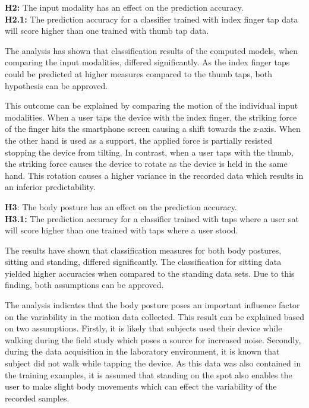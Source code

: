 \begin{center}
  \begin{framed}
    \textbf{H2:} The input modality has an effect on the prediction accuracy.\\
    \textbf{H2.1:} The prediction accuracy for a classifier trained with index finger tap data will score higher than one trained with thumb tap data.
  \end{framed}
\end{center}

The analysis has shown that classification results of the computed models, when comparing the input modalities, differed significantly. As the index finger taps could be predicted at higher measures compared to the thumb taps, both hypothesis can be approved.

This outcome can be explained by comparing the motion of the individual input modalities. When a user taps the device with the index finger, the striking force of the finger hits the smartphone screen causing a shift towards the z-axis. When the other hand is used as a support, the applied force is partially resisted stopping the device from tilting. In contrast, when a user taps with the thumb, the striking force causes the device to rotate as the device is held in the same hand. This rotation causes a higher variance in the recorded data which results in an inferior predictability.



\begin{center}
  \begin{framed}
    \textbf{H3}: The body posture has an effect on the prediction accuracy.\\
    \textbf{H3.1:} The prediction accuracy for a classifier trained with taps where a user sat will score higher than one trained with taps where a user stood.
  \end{framed}
\end{center}

The results have shown that classification measures for both body postures, sitting and standing, differed significantly. The classification for sitting data yielded higher accuracies when compared to the standing data sets. Due to this finding, both assumptions can be approved.

The analysis indicates that the body posture poses an important influence factor on the variability in the motion data collected. This result can be explained based on two assumptions. Firstly, it is likely that subjects used their device while walking during the field study which poses a source for increased noise. Secondly, during the data acquisition in the laboratory environment, it is known that subject did not walk while tapping the device. As this data was also contained in the training examples, it is assumed that standing on the spot also enables the user to make slight body movements which can effect the variability of the recorded samples.

